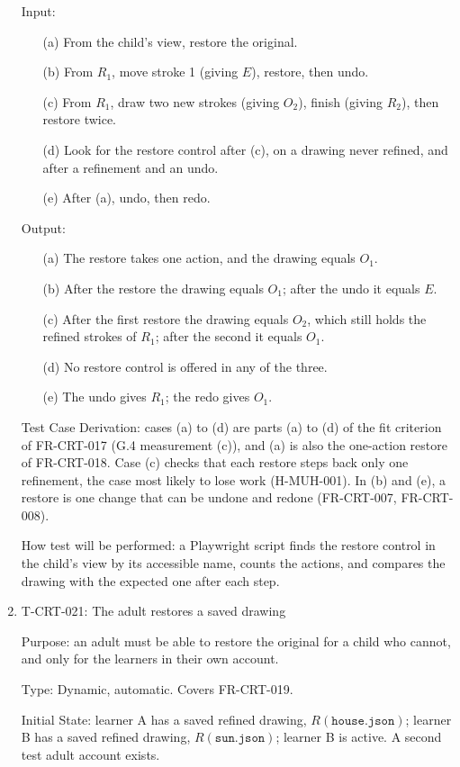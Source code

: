 \documentclass[12pt, titlepage]{article}
\newcommand{\testitem}[1]{\item #1\par\nopagebreak}
\begin{document}
\begin{enumerate}
Input:
\begin{itemize}
\item[(a)] From the child's view, restore the original.
\item[(b)] From $R_1$, move stroke 1 (giving $E$), restore, then undo.
\item[(c)] From $R_1$, draw two new strokes (giving $O_2$), finish (giving
$R_2$), then restore twice.
\item[(d)] Look for the restore control after (c), on a drawing never
refined, and after a refinement and an undo.
\item[(e)] After (a), undo, then redo.
\end{itemize}

Output:
\begin{itemize}
\item[(a)] The restore takes one action, and the drawing equals $O_1$.
\item[(b)] After the restore the drawing equals $O_1$; after the undo it
equals $E$.
\item[(c)] After the first restore the drawing equals $O_2$, which still
holds the refined strokes of $R_1$; after the second it equals $O_1$.
\item[(d)] No restore control is offered in any of the three.
\item[(e)] The undo gives $R_1$; the redo gives $O_1$.
\end{itemize}

Test Case Derivation: cases (a) to (d) are parts (a) to (d) of the fit
criterion of FR-CRT-017 (G.4 measurement (c)), and (a) is also the one-action
restore of FR-CRT-018. Case (c) checks that each restore steps back only one
refinement, the case most likely to lose work (H-MUH-001). In (b) and (e),
a restore is one change that can be undone and redone (FR-CRT-007,
FR-CRT-008).

How test will be performed: a Playwright script finds the restore control in
the child's view by its accessible name, counts the actions, and compares
the drawing with the expected one after each step.

\testitem{T-CRT-021: The adult restores a saved drawing}

Purpose: an adult must be able to restore the original for a child who
cannot, and only for the learners in their own account.

Type: Dynamic, automatic. Covers FR-CRT-019.

Initial State: learner A has a saved refined drawing,
$R(\texttt{house.json})$; learner B has a saved refined drawing,
$R(\texttt{sun.json})$; learner B is active. A second test adult account
exists.


\end{enumerate}
\end{document}
